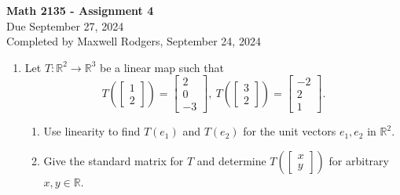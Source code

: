 \documentclass[12pt,a4paper]{amsart}
\newcommand{\R}{\mathbb{R}}
\begin{document}
\begin{center}
{\Large\textbf{Math 2135 - Assignment 4}}\\
\medskip
Due September 27, 2024 \\
Completed by Maxwell Rodgers, September 24, 2024
\end{center}
\medskip
\thispagestyle{empty}

\begin{enumerate}
   

\item
 Let $T\colon\R^2\to\R^3$ be a linear map such that 
\[ T(\left[\begin{matrix} 1 \\ 2 \end{matrix}\right]) = \left[\begin{matrix} 2 \\ 0 \\ -3 \end{matrix}\right],\ T(\left[\begin{matrix} 3 \\ 2 \end{matrix}\right]) = \left[\begin{matrix} -2 \\ 2 \\ 1 \end{matrix}\right]. \]
\begin{enumerate}
\item
  Use linearity to find $T(e_1)$ and $T(e_2)$ for the unit vectors $e_1,e_2$ in $\R^2$.
\item
 Give the standard matrix for $T$ and determine $T(\left[\begin{matrix} x \\ y \end{matrix}\right])$ for arbitrary $x,y\in\R$.
\end{enumerate}



\end{enumerate}
\end{document}
